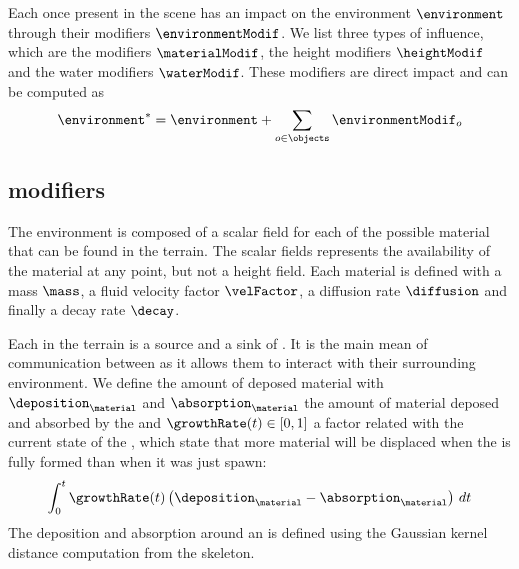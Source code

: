 



\section{}
\label{sec:env-obj_materials}
Each  once present in the scene has an impact on the environment $\environment$ through their modifiers $\environmentModif$. We list three types of influence, which are the  modifiers $\materialModif$, the height modifiers $\heightModif$ and the water modifiers $\waterModif$. These modifiers are direct impact and can be computed as 
\begin{align*}
    \environment^* = \environment + \sum_{o \in \objects}{ \environmentModif_o }
\end{align*}

\subsection{ modifiers}
The environment is composed of a scalar field for each of the possible material that can be found in the terrain. The scalar fields represents the availability of the material at any point, but not a height field. Each material is defined with a mass $\mass$, a fluid velocity factor $\velFactor$, a diffusion rate $\diffusion$ and finally a decay rate $\decay$.

Each  in the terrain is a source and a sink of . It is the main mean of communication between  as it allows them to interact with their surrounding environment. We define the amount of deposed material with $\deposition_\material$ and $\absorption_\material$ the amount of material deposed and absorbed by the  and $\growthRate(t) \in [0, 1]$ a factor related with the current state of the , which state that more material will be displaced when the  is fully formed than when it was just spawn:
\begin{align*}
    \int_{0}^{t} {\growthRate(t) \left( \deposition_\material - \absorption_\material \right) \,dt}
\end{align*} 
The deposition and absorption around an  is defined using the Gaussian kernel distance computation from the skeleton.

